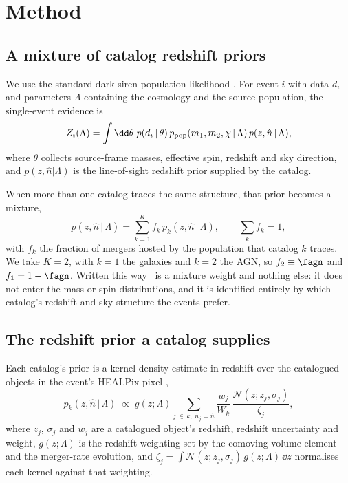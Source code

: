 \section{Method}
\label{sec:methods}

\subsection{A mixture of catalog redshift priors}
\label{sec:methods:mixture}

We use the standard dark-siren population likelihood
\citep{ChenFishbachHolz2018, MandelFarrGair2019, Gray2020}. For event $i$ with
data $d_i$ and parameters $\Lambda$ containing the cosmology and the source
population, the single-event evidence is
\begin{equation}
  Z_i(\Lambda) = \int \dd\theta\; p(d_i \,|\, \theta)\,
                 p_{\rm pop}(m_1, m_2, \chi \,|\, \Lambda)\,
                 p(z, \hat{n} \,|\, \Lambda),
  \label{eq:zi}
\end{equation}
where $\theta$ collects source-frame masses, effective spin, redshift and sky
direction, and $p(z, \hat{n}|\Lambda)$ is the line-of-sight redshift prior
supplied by the catalog.

When more than one catalog traces the same structure, that prior becomes a
mixture,
\begin{equation}
  p(z, \hat{n} \,|\, \Lambda) = \sum_{k=1}^{K} f_k \,
      p_k(z, \hat{n} \,|\, \Lambda), \qquad \sum_k f_k = 1,
  \label{eq:mixture}
\end{equation}
with $f_k$ the fraction of mergers hosted by the population that catalog $k$
traces. We take $K = 2$, with $k = 1$ the galaxies and $k = 2$ the AGN, so
$f_2 \equiv \fagn$ and $f_1 = 1 - \fagn$. Written this way \fagn\ is a mixture
weight and nothing else: it does not enter the mass or spin distributions, and
it is identified entirely by which catalog's redshift and sky structure the
events prefer.

\subsection{The redshift prior a catalog supplies}
\label{sec:methods:prior}

Each catalog's prior is a kernel-density estimate in redshift over the
catalogued objects in the event's HEALPix pixel \citep{Gorski2005, Gray2022},
\begin{equation}
  p_k(z, \hat{n} \,|\, \Lambda) \;\propto\; g(z; \Lambda)
     \sum_{j \,\in\, k,\; \hat{n}_j = \hat{n}}
     \frac{w_j}{W_k}\,
     \frac{\mathcal{N}(z; z_j, \sigma_j)}{\zeta_j},
  \label{eq:pcat}
\end{equation}
where $z_j$, $\sigma_j$ and $w_j$ are a catalogued object's redshift, redshift
uncertainty and weight, $g(z;\Lambda)$ is the redshift weighting set by the
comoving volume element and the merger-rate evolution, and
$\zeta_j = \int \mathcal{N}(z; z_j, \sigma_j)\, g(z;\Lambda)\, \dd z$
normalises each kernel against that weighting.

